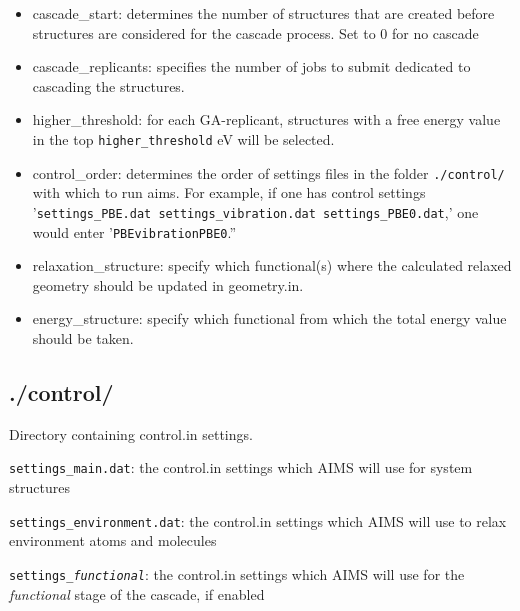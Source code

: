 \begin{itemize}

\item cascade\_start: determines the number of structures that are created before structures are considered for the cascade process. Set to 0 for no cascade

\item cascade\_replicants: specifies the number of jobs to submit dedicated to cascading the structures.

\item higher\_threshold: for each GA-replicant, structures with a free energy value in the top \texttt{higher\_threshold} eV will be selected.

\item control\_order: determines the order of settings files in the folder \texttt{./control/} with which to run aims. For example, if one has control settings \\'\texttt{settings\_PBE.dat \hspace{3 mm} settings\_vibration.dat \hspace{3 mm} settings\_PBE0.dat},' one would enter '\texttt{PBE\hspace{3 mm}vibration\hspace{3 mm}PBE0}.''

\item relaxation\_structure: specify which functional(s) where the calculated relaxed geometry should be updated in geometry.in.

\item energy\_structure: specify which functional from which the total energy value should be taken.

\end{itemize}

\subsection{./control/}

Directory containing control.in settings.

\texttt{settings\_main.dat}: the control.in settings which AIMS will use for system structures

\texttt{settings\_environment.dat}: the control.in settings which AIMS will use to relax environment atoms and molecules

\texttt{settings\_{\em functional}}: the control.in settings which AIMS will use for the {\em functional} stage of the cascade, if enabled

